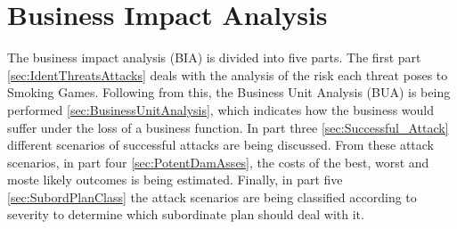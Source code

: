 \chapter{Business Impact Analysis}
The business impact analysis (BIA) is divided into five parts\cite{whitman1}. The first part \ref{sec:IdentThreatsAttacks} deals with the analysis of the risk each threat poses to Smoking Games. Following from this, the Business Unit Analysis (BUA) is being performed \ref{sec:BusinessUnitAnalysis}, which indicates how the business would suffer under the loss of a business function. In part three \ref{sec:Successful_Attack} different scenarios of successful attacks are being discussed. From these attack scenarios, in part four \ref{sec:PotentDamAsses}, the costs of the best, worst and moste likely outcomes is being estimated. Finally, in part five \ref{sec:SubordPlanClass} the attack scenarios are being classified according to severity to determine which subordinate plan should deal with it.







